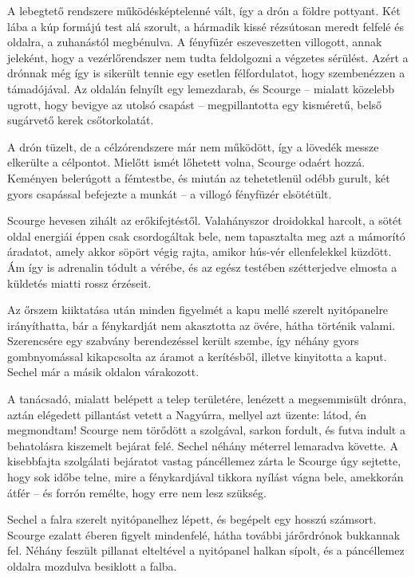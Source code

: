 \documentclass{thesis-ekf}
\theoremstyle{definition}
\begin{document}
A lebegtető rendszere működésképtelenné vált, így a drón a földre pottyant. Két lába a kúp
formájú test alá szorult, a hármadik kissé rézsútosan meredt felfelé és oldalra, a zuhanástól
megbénulva. A fényfüzér eszeveszetten villogott, annak jeleként, hogy a vezérlőrendszer nem
tudta feldolgozni a végzetes sérülést. Azért a drónnak még így is sikerült tennie egy esetlen
félfordulatot, hogy szembenézzen a támadójával. Az oldalán felnyílt egy lemezdarab, és
Scourge -- mialatt közelebb ugrott, hogy bevigye az utolsó csapást -- megpillantotta egy
kisméretű, belső sugárvető kerek csőtorkolatát.

A drón tüzelt, de a célzórendszere már nem működött, így a lövedék messze elkerülte a
célpontot. Mielőtt ismét lőhetett volna, Scourge odaért hozzá. Keményen belerúgott a
fémtestbe, és miután az tehetetlenül odébb gurult, két gyors csapással befejezte a munkát -- a
villogó fényfüzér elsötétült.

Scourge hevesen zihált az erőkifejtéstől. Valahányszor droidokkal harcolt, a sötét oldal
energiái éppen csak csordogáltak bele, nem tapasztalta meg azt a mámorító áradatot, amely
akkor söpört végig rajta, amikor hús-vér ellenfelekkel küzdött. Ám így is adrenalin tódult a
vérébe, és az egész testében szétterjedve elmosta a küldetés miatti rossz érzéseit.

Az őrszem kiiktatása után minden figyelmét a kapu mellé szerelt nyitópanelre irányíthatta, bár
a fénykardját nem akasztotta az övére, hátha történik valami. Szerencsére egy szabvány
berendezéssel került szembe, így néhány gyors gombnyomással kikapcsolta az áramot a
kerítésből, illetve kinyitotta a kaput. Sechel már a másik oldalon várakozott.

A tanácsadó, mialatt belépett a telep területére, lenézett a megsemmisült drónra, aztán
elégedett pillantást vetett a Nagyúrra, mellyel azt üzente: látod, én megmondtam! Scourge nem
törődött a szolgával, sarkon fordult, és futva indult a behatolásra kiszemelt bejárat felé. Sechel
néhány méterrel lemaradva követte. A kisebbfajta szolgálati bejáratot vastag páncéllemez zárta
le Scourge úgy sejtette, hogy sok időbe telne, mire a fénykardjával tikkora nyílást vágna bele,
amekkorán átfér -- és forrón remélte, hogy erre nem lesz szükség.

Sechel a falra szerelt nyitópanelhez lépett, és begépelt egy hosszú számsort. Scourge
ezalatt éberen figyelt mindenfelé, hátha további járőrdrónok bukkannak fel. Néhány feszült
pillanat elteltével a nyitópanel halkan sípolt, és a páncéllemez oldalra mozdulva besiklott a
falba.
\end{document}
